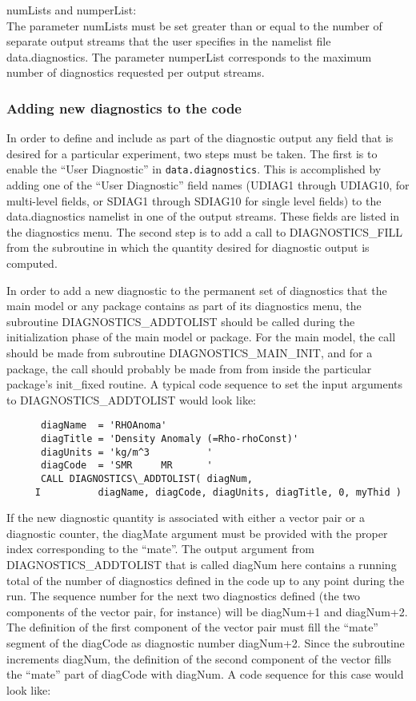 \noindent numLists and numperList: \\
\noindent The parameter numLists must be set greater than or equal to
the number of separate output streams that the user specifies in the
namelist file data.diagnostics.  The parameter numperList corresponds
to the maximum number of diagnostics requested per output streams.

\subsubsection{Adding new diagnostics to the code}

\noindent
In order to define and include as part of the diagnostic output any
field that is desired for a particular experiment, two steps must be
taken. The first is to enable the ``User Diagnostic'' in
{\tt data.diagnostics}. This is accomplished by adding one of the ``User
Diagnostic'' field names (UDIAG1 through UDIAG10, for multi-level
fields, or SDIAG1 through SDIAG10 for single level fields) to the
data.diagnostics namelist in one of the output streams. These fields
are listed in the diagnostics menu. The second step is to add a call
to DIAGNOSTICS\_FILL from the subroutine in which the quantity desired
for diagnostic output is computed.

\noindent
In order to add a new diagnostic to the permanent set of diagnostics
that the main model or any package contains as part of its diagnostics
menu, the subroutine DIAGNOSTICS\_ADDTOLIST should be called during the
initialization phase of the main model or package. For the main model,
the call should be made from subroutine DIAGNOSTICS\_MAIN\_INIT, and
for a package, the call should probably be made from
from inside the particular package's init\_fixed routine.
A typical code sequence to set the
input arguments to DIAGNOSTICS\_ADDTOLIST would look like:

\begin{verbatim}
      diagName  = 'RHOAnoma'
      diagTitle = 'Density Anomaly (=Rho-rhoConst)'
      diagUnits = 'kg/m^3          '
      diagCode  = 'SMR     MR      '
      CALL DIAGNOSTICS\_ADDTOLIST( diagNum,
     I          diagName, diagCode, diagUnits, diagTitle, 0, myThid )
\end{verbatim}

\noindent If the new diagnostic quantity is associated with either a
vector pair or a diagnostic counter, the diagMate argument must be
provided with the proper index corresponding to the ``mate''.
The output argument from DIAGNOSTICS\_ADDTOLIST that is called diagNum here
contains a running total of the number of diagnostics defined in the code up to
any point during the run. The sequence number for the next two
diagnostics defined (the two components of the vector pair, for
instance) will be diagNum+1 and diagNum+2. The definition of the first
component of the vector pair must fill the ``mate'' segment of the
diagCode as diagnostic number diagNum+2.  Since the subroutine
increments diagNum, the definition of the second component of the
vector fills the ``mate'' part of diagCode with diagNum. A code
sequence for this case would look like:

